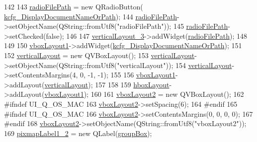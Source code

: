 \begin{DoxyCode}
142 
143         \hyperlink{classUi__DlgGeneralBase_ac39d9951537fef09370ebbbf6bf52d44}{radioFilePath} = \textcolor{keyword}{new} QRadioButton(
      \hyperlink{classUi__DlgGeneralBase_a1e6d624833130b412bc2bea8a1861025}{kcfg\_DisplayDocumentNameOrPath});
144         \hyperlink{classUi__DlgGeneralBase_ac39d9951537fef09370ebbbf6bf52d44}{radioFilePath}->setObjectName(QString::fromUtf8(\textcolor{stringliteral}{"radioFilePath"}));
145         \hyperlink{classUi__DlgGeneralBase_ac39d9951537fef09370ebbbf6bf52d44}{radioFilePath}->setChecked(\textcolor{keyword}{false});
146 
147         \hyperlink{classUi__DlgGeneralBase_a3f67713f653ddd26bc82cb90b4836bd4}{verticalLayout\_3}->addWidget(\hyperlink{classUi__DlgGeneralBase_ac39d9951537fef09370ebbbf6bf52d44}{radioFilePath});
148 
149 
150         \hyperlink{classUi__DlgGeneralBase_ada5c5c425bafcc272b9562c93ed886e8}{vboxLayout1}->addWidget(\hyperlink{classUi__DlgGeneralBase_a1e6d624833130b412bc2bea8a1861025}{kcfg\_DisplayDocumentNameOrPath});
151 
152         \hyperlink{classUi__DlgGeneralBase_a66524be0ec0dc019bbc7f31e2fd50526}{verticalLayout} = \textcolor{keyword}{new} QVBoxLayout();
153         \hyperlink{classUi__DlgGeneralBase_a66524be0ec0dc019bbc7f31e2fd50526}{verticalLayout}->setObjectName(QString::fromUtf8(\textcolor{stringliteral}{"verticalLayout"}));
154         \hyperlink{classUi__DlgGeneralBase_a66524be0ec0dc019bbc7f31e2fd50526}{verticalLayout}->setContentsMargins(4, 0, -1, -1);
155 
156         \hyperlink{classUi__DlgGeneralBase_ada5c5c425bafcc272b9562c93ed886e8}{vboxLayout1}->addLayout(\hyperlink{classUi__DlgGeneralBase_a66524be0ec0dc019bbc7f31e2fd50526}{verticalLayout});
157 
158 
159         \hyperlink{classUi__DlgGeneralBase_a43bdd775726703c8af00b360880cd7a9}{hboxLayout}->addLayout(\hyperlink{classUi__DlgGeneralBase_ada5c5c425bafcc272b9562c93ed886e8}{vboxLayout1});
160 
161         \hyperlink{classUi__DlgGeneralBase_aae73c98ee62ac66deae57632a9d82a4c}{vboxLayout2} = \textcolor{keyword}{new} QVBoxLayout();
162 \textcolor{preprocessor}{#ifndef UI\_Q\_OS\_MAC}
163         \hyperlink{classUi__DlgGeneralBase_aae73c98ee62ac66deae57632a9d82a4c}{vboxLayout2}->setSpacing(6);
164 \textcolor{preprocessor}{#endif}
165 \textcolor{preprocessor}{#ifndef UI\_Q\_OS\_MAC}
166         \hyperlink{classUi__DlgGeneralBase_aae73c98ee62ac66deae57632a9d82a4c}{vboxLayout2}->setContentsMargins(0, 0, 0, 0);
167 \textcolor{preprocessor}{#endif}
168         \hyperlink{classUi__DlgGeneralBase_aae73c98ee62ac66deae57632a9d82a4c}{vboxLayout2}->setObjectName(QString::fromUtf8(\textcolor{stringliteral}{"vboxLayout2"}));
169         \hyperlink{classUi__DlgGeneralBase_ad5978e3e0b3caa214086a2dfa6e10a4f}{pixmapLabel1\_2} = \textcolor{keyword}{new} QLabel(\hyperlink{classUi__DlgGeneralBase_aa25408255cc1bc3b6d720b58ceb42e32}{groupBox});

\end{DoxyCode}
